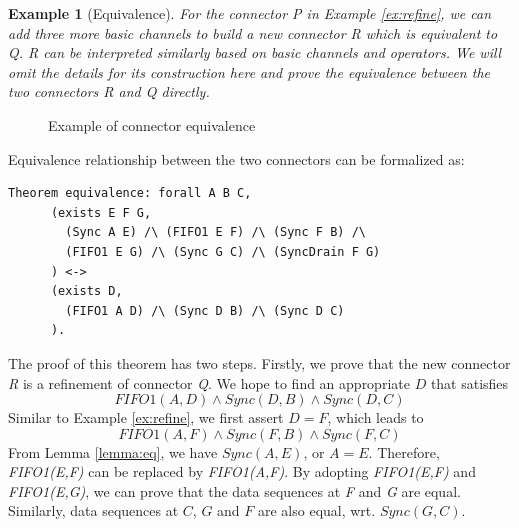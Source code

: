 \documentclass[preprint,3p]{elsarticle}
\newtheorem{example}{Example}[section]
\begin{document}
\begin{example}[Equivalence]
For the connector \emph{P} in Example \ref{ex:refine}, we can add three more basic channels to build a new connector \emph{R} which is equivalent to \emph{Q}. \emph{R} can be interpreted similarly based on basic channels and operators. We will omit the details for its construction here and prove the equivalence between the two connectors \emph{R} and \emph{Q} directly.
\end{example}

\begin{figure}[htb]
\vspace{0cm}
\centering
{}
\caption{Example of connector equivalence}
\label{refine1}

\end{figure}

Equivalence relationship between the two connectors can be formalized as:
\begin{lstlisting}[language=coq]
    Theorem equivalence: forall A B C,
      (exists E F G,
        (Sync A E) /\ (FIFO1 E F) /\ (Sync F B) /\
        (FIFO1 E G) /\ (Sync G C) /\ (SyncDrain F G)
      ) <->
      (exists D,
        (FIFO1 A D) /\ (Sync D B) /\ (Sync D C)
      ).
\end{lstlisting}
The proof of this theorem has two steps. Firstly, we prove that the new connector \emph{R} is a refinement of connector \emph{Q}.
We hope to find an appropriate \emph{$D$} that satisfies
\[
FIFO1(A,D)\wedge Sync(D,B) \wedge Sync(D,C)
\]
Similar to Example \ref{ex:refine}, we first assert $D=F$, which leads to
\[
FIFO1(A,F) \land Sync(F,B) \wedge Sync(F,C)
\]
From Lemma \ref{lemma:eq}, we have $Sync(A,E)$, or $A=E$. Therefore, \emph{FIFO1(E,F)} can be replaced by \emph{FIFO1(A,F)}. By adopting \emph{FIFO1(E,F)} and \emph{FIFO1(E,G)}, we can prove that the data sequences at \emph{F} and \emph{G} are equal. Similarly, data sequences at $C$, $G$ and $F$ are also equal, wrt. $Sync(G,C)$.
\end{document}
